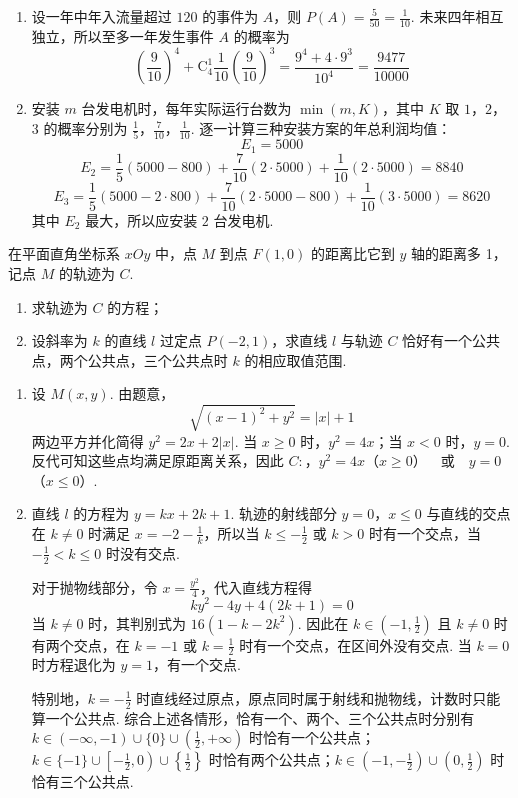 \begin{solution}
\begin{enumerate}
\item 设一年中年入流量超过 \(120\) 的事件为 \(A\)，则 \(P(A)=\frac{5}{50}=\frac{1}{10}\). 未来四年相互独立，所以至多一年发生事件 \(A\) 的概率为
\[
\left(\frac9{10}\right)^4+\mathrm C_4^1\frac1{10}\left(\frac9{10}\right)^3
=\frac{9^4+4\cdot9^3}{10^4}
=\frac{9477}{10000}
\]
\item 安装 \(m\) 台发电机时，每年实际运行台数为 \(\min(m,K)\)，其中 \(K\) 取 \(1\)，\(2\)，\(3\) 的概率分别为 \(\frac15\)，\(\frac7{10}\)，\(\frac1{10}\). 逐一计算三种安装方案的年总利润均值：
\[
E_1=5000
\]
\[
E_2=\frac15(5000-800)+\frac7{10}(2\cdot5000)+\frac1{10}(2\cdot5000)=8840
\]
\[
E_3=\frac15(5000-2\cdot800)+\frac7{10}(2\cdot5000-800)+\frac1{10}(3\cdot5000)=8620
\]
其中 \(E_2\) 最大，所以应安装 \(2\) 台发电机.
\end{enumerate}
\end{solution}

\begin{problem}
在平面直角坐标系 \(xOy\) 中，点 \(M\) 到点 \(F(1,0)\) 的距离比它到 \(y\) 轴的距离多 1，记点 \(M\) 的轨迹为 \(C\).
\begin{enumerate}
\item 求轨迹为 \(C\) 的方程；
\item 设斜率为 \(k\) 的直线 \(l\) 过定点 \(P(-2,1)\)，求直线 \(l\) 与轨迹 \(C\) 恰好有一个公共点，两个公共点，三个公共点时 \(k\) 的相应取值范围.
\end{enumerate}
\end{problem}

\begin{solution}
\begin{enumerate}
\item 设 \(M(x,y)\). 由题意，
\[
\sqrt{(x-1)^2+y^2}=|x|+1
\]
两边平方并化简得 \(y^2=2x+2|x|\). 当 \(x\geqslant0\) 时，\(y^2=4x\)；当 \(x<0\) 时，\(y=0\). 反代可知这些点均满足原距离关系，因此
\(C:\)，\(y^2=4x\)（\(x\geqslant0\)）\(\quad\text{或}\quad y=0\)（\(x\leqslant0\)）.
\item 直线 \(l\) 的方程为 \(y=kx+2k+1\). 轨迹的射线部分 \(y=0\)，\(x\leqslant0\) 与直线的交点在 \(k\ne0\) 时满足 \(x=-2-\frac1k\)，所以当 \(k\leqslant-\frac12\) 或 \(k>0\) 时有一个交点，当 \(-\frac12<k\leqslant0\) 时没有交点.

对于抛物线部分，令 \(x=\frac{y^2}{4}\)，代入直线方程得
\[
ky^2-4y+4(2k+1)=0
\]
当 \(k\ne0\) 时，其判别式为 \(16(1-k-2k^2)\). 因此在 \(k\in(-1,\frac12)\) 且 \(k\ne0\) 时有两个交点，在 \(k=-1\) 或 \(k=\frac12\) 时有一个交点，在区间外没有交点. 当 \(k=0\) 时方程退化为 \(y=1\)，有一个交点.

特别地，\(k=-\frac12\) 时直线经过原点，原点同时属于射线和抛物线，计数时只能算一个公共点. 综合上述各情形，恰有一个、两个、三个公共点时分别有
\(k\in(-\infty,-1)\cup\{0\}\cup\left(\frac12,+\infty\right)\) 时恰有一个公共点；\(k\in\{-1\}\cup\left[-\frac12,0\right)\cup\left\{\frac12\right\}\) 时恰有两个公共点；\(k\in\left(-1,-\frac12\right)\cup\left(0,\frac12\right)\) 时恰有三个公共点.
\end{enumerate}
\end{solution}

